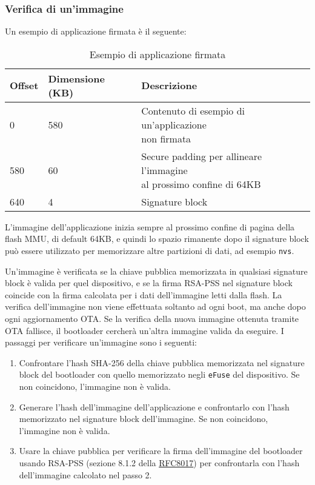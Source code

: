\documentclass[a4paper]{article}
\begin{document}
\subsubsection{Verifica di un'immagine}
Un esempio di applicazione firmata è il seguente:
\begin{table}[H]
  \centering
  \begin{tabular}{|l|l|l|}
    \hline
    \textbf{Offset} & \textbf{Dimensione (KB)} & \textbf{Descrizione} \\
    \hline
    0 & 580 & \makecell[l]{
      Contenuto di esempio di un'applicazione \\ non firmata
    } \\
    \hline
    580 & 60 & \makecell[l]{
      Secure padding per allineare l'immagine \\ al prossimo confine di 64KB
    } \\
    \hline
    640 & 4 & Signature block \\
    \hline
  \end{tabular}
  \caption{Esempio di applicazione firmata}
\end{table}
\noindent
L'immagine dell'applicazione inizia sempre al prossimo confine di pagina della flash MMU,
di default 64KB, e quindi lo spazio rimanente dopo il signature block può essere
utilizzato per memorizzare altre partizioni di dati, ad esempio \texttt{nvs}.

\vspace{1em}
\label{Verifica di un'immagine}
\noindent
Un'immagine è verificata se la chiave pubblica memorizzata in qualsiasi signature block
è valida per quel dispositivo, e se la firma RSA-PSS nel signature block coincide con
la firma calcolata per i dati dell'immagine letti dalla flash.
La verifica dell'immagine non viene effettuata soltanto ad ogni boot, ma anche dopo
ogni aggiornamento OTA. Se la verifica della nuova immagine ottenuta tramite OTA
fallisce, il bootloader cercherà un'altra immagine valida da eseguire.
I passaggi per verificare un'immagine sono i seguenti:
\begin{enumerate}
  \item Confrontare l'hash SHA-256 della chiave pubblica memorizzata nel signature block
    del bootloader con quello memorizzato negli \texttt{eFuse} del dispositivo.
    Se non coincidono, l'immagine non è valida.

  \item Generare l'hash dell'immagine dell'applicazione e confrontarlo con l'hash
    memorizzato nel signature block dell'immagine. Se non coincidono, l'immagine
    non è valida.

  \item Usare la chiave pubblica per verificare la firma dell'immagine del bootloader
    usando RSA-PSS (sezione 8.1.2 della \href{https://www.rfc-editor.org/rfc/rfc8017.html}{RFC8017})
    per confrontarla con l'hash dell'immagine calcolato nel passo 2.
\end{enumerate}
\end{document}
